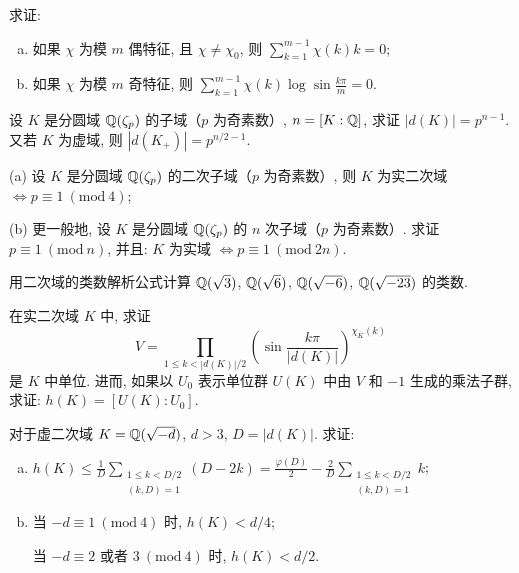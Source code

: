 \begin{Exercises}
\item 求证:
\begin{enumerate}[(a)]
  \item 如果 $\chi$ 为模 $m$ 偶特征, 且 $\chi\neq\chi_0$, 则 $\sum_{k=1}^{m-1}\chi(k)k=0$;
  \item 如果 $\chi$ 为模 $m$ 奇特征, 则 $\sum_{k=1}^{m-1}\chi(k)\log\sin\frac{k\pi}{m}=0$.
\end{enumerate}

\item 设 $K$ 是分圆域 $\mathbb{Q}(\zeta_p)$ 的子域（$p$ 为奇素数）, $n=[K:\mathbb{Q}]$, 求证 $|d(K)|=p^{n-1}$. 又若 $K$ 为虚域, 则 $|d(K_+)|=p^{n/2-1}$.

\item (a) 设 $K$ 是分圆域 $\mathbb{Q}(\zeta_p)$ 的二次子域（$p$ 为奇素数）, 则 $K$ 为实二次域 $\Leftrightarrow p\equiv 1\ (\mathrm{mod}\ 4)$;

(b) 更一般地, 设 $K$ 是分圆域 $\mathbb{Q}(\zeta_p)$ 的 $n$ 次子域（$p$ 为奇素数）. 求证 $p\equiv 1\ (\mathrm{mod}\ n)$, 并且: $K$ 为实域 $\Leftrightarrow p\equiv 1\ (\mathrm{mod}\ 2n)$.

\item 用二次域的类数解析公式计算 $\mathbb{Q}(\sqrt{3})$, $\mathbb{Q}(\sqrt{6})$, $\mathbb{Q}(\sqrt{-6})$, $\mathbb{Q}(\sqrt{-23})$ 的类数.

\item 在实二次域 $K$ 中, 求证
\[
  V=\prod_{1\leqslant k<|d(K)|/2}\left(\sin\frac{k\pi}{|d(K)|}\right)^{\chi_K(k)}
\]
是 $K$ 中单位. 进而, 如果以 $U_0$ 表示单位群 $U(K)$ 中由 $V$ 和 $-1$ 生成的乘法子群, 求证: $h(K)=[U(K):U_0]$.

\item 对于虚二次域 $K=\mathbb{Q}(\sqrt{-d})$, $d>3$, $D=|d(K)|$. 求证:
\begin{enumerate}[(a)]
  \item $h(K)\leqslant\frac{1}{D}\sum_{\substack{1\leqslant k<D/2\\ (k,D)=1}}(D-2k)=\frac{\varphi(D)}{2}-\frac{2}{D}\sum_{\substack{1\leqslant k<D/2\\ (k,D)=1}}k$;
  \item 当 $-d\equiv 1\ (\mathrm{mod}\ 4)$ 时, $h(K)<d/4$;

  当 $-d\equiv 2$ 或者 $3\ (\mathrm{mod}\ 4)$ 时, $h(K)<d/2$.
\end{enumerate}


\end{Exercises}
